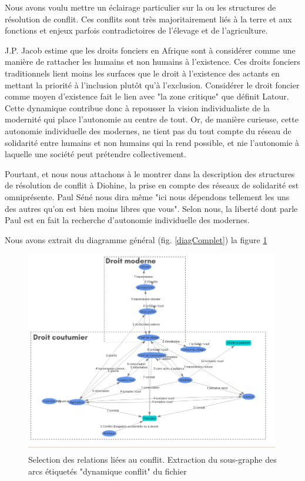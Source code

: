 Nous avons voulu mettre un éclairage particulier sur la ou les structures de résolution de conflit. Ces conflits sont très majoritairement liés à la terre et aux fonctions et enjeux parfois contradictoires de l'élevage et de l'agriculture.

J.P. Jacob\cite{jacob_terres_2007} estime que les droits fonciers en Afrique sont à considérer comme une manière de rattacher les humains et non humains à l'existence. Ces droits fonciers traditionnels lient moins les surfaces que le droit à l'existence des actants en mettant la priorité à l'inclusion plutôt qu'à l'exclusion. Considérer le droit foncier comme moyen d'existence fait le lien avec "la zone critique" que définit Latour\cite{latour_face_2015}. Cette dynamique contribue donc à repousser la vision individualiste de la modernité qui place l'autonomie au centre de tout. Or, de manière curieuse, cette autonomie individuelle des modernes, ne tient pas du tout compte du réseau de solidarité entre humains et non humains qui la rend possible, et nie l'autonomie à laquelle une société peut prétendre collectivement.

Pourtant, et nous nous  attachons à le montrer dans la description des structures de résolution de conflit à Diohine, la prise en compte des réseaux de solidarité est omniprésente. Paul Séné nous dira même "ici nous dépendons tellement les uns des autres qu'on est bien moins libres que vous". Selon nous, la liberté dont parle Paul est en fait la recherche d'autonomie individuelle des modernes.


Nous avons extrait du diagramme général (fig. \ref{diagComplet}) la figure \ref{fig:conflict}

\begin{figure}
  \begin{center}
    \includegraphics[width=0.99\textwidth]{img/zoneDroitConflits.png}
  \end{center}
  \caption{Selection des relations liées au conflit. Extraction du sous-graphe des arcs étiquetés "dynamique conflit" du fichier}
  \label{fig:conflict}
\end{figure}

